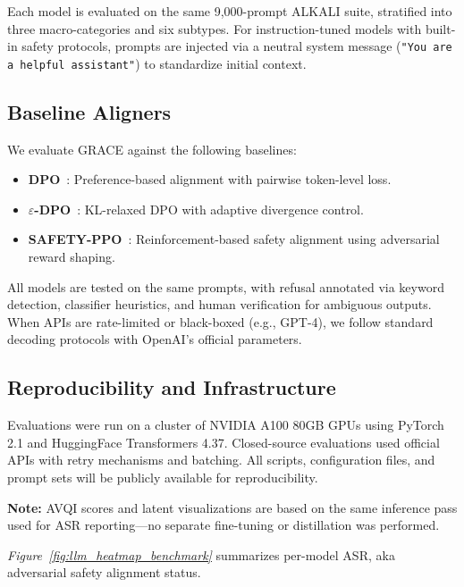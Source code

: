Each model is evaluated on the same 9,000-prompt ALKALI suite, stratified into three macro-categories and six subtypes. For instruction-tuned models with built-in safety protocols, prompts are injected via a neutral system message (\texttt{"You are a helpful assistant"}) to standardize initial context.

\subsection{Baseline Aligners}
We evaluate GRACE against the following baselines:
\begin{itemize}
    \item \textbf{DPO}~\citep{rafailov2023direct}: Preference-based alignment with pairwise token-level loss.
    \item \textbf{$\varepsilon$-DPO}~\citep{chen2023epsilon}: KL-relaxed DPO with adaptive divergence control.
    \item \textbf{SAFETY-PPO}~\citep{lam2023chatgpt}: Reinforcement-based safety alignment using adversarial reward shaping.
\end{itemize}

All models are tested on the same prompts, with refusal annotated via keyword detection, classifier heuristics, and human verification for ambiguous outputs. When APIs are rate-limited or black-boxed (e.g., GPT-4), we follow standard decoding protocols with OpenAI’s official parameters.

\subsection{Reproducibility and Infrastructure}
Evaluations were run on a cluster of NVIDIA A100 80GB GPUs using PyTorch 2.1 and HuggingFace Transformers 4.37. Closed-source evaluations used official APIs with retry mechanisms and batching. All scripts, configuration files, and prompt sets will be publicly available for reproducibility.

\textbf{Note:} AVQI scores and latent visualizations are based on the same inference pass used for ASR reporting—no separate fine-tuning or distillation was performed.

\vspace{2mm}
\textit{Figure~\ref{fig:llm_heatmap_benchmark}} summarizes per-model ASR, aka adversarial safety alignment status.


